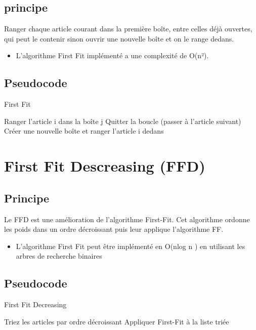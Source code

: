 \documentclass[12pt]{article}
\begin{document}
\subsection{principe}
Ranger chaque article courant dans la première boîte, entre celles déjà ouvertes, qui peut le contenir sinon ouvrir une nouvelle boîte et on le range dedans.
\begin{itemize}
    \item L’algorithme First Fit implémenté a une complexité de O(n²). 
\end{itemize}

\subsection{Pseudocode}
\begin{algorithm}[!h]
    \caption{First Fit}
    \begin{algorithmic}
              \STATE Ranger l’article i dans la boîte j\;
              \STATE Quitter la boucle (passer à l'article suivant)\;
             \ENDIF 
        \ENDFOR
            \STATE Créer une nouvelle boîte et ranger l’article i dedans\;
        \ENDIF
    \ENDFOR
    \end{algorithmic}
\end{algorithm}

\section{First Fit Descreasing (FFD)}
\subsection{Principe}
Le FFD est une amélioration de l’algorithme First-Fit. Cet algorithme ordonne les poids dans un ordre décroissant puis leur applique l’algorithme FF.
\begin{itemize}
    \item L’algorithme First Fit peut être implémenté en O(nlog n ) en utilisant les arbres de recherche binaires 
\end{itemize}

\subsection{Pseudocode}
\begin{algorithm}[!h]
    \caption{First Fit Decreasing }
    \begin{algorithmic}
        \STATE Triez les articles par ordre décroissant\;
        \STATE Appliquer First-Fit à la liste triée \;
    \end{algorithmic}
\end{algorithm}
\end{document}
